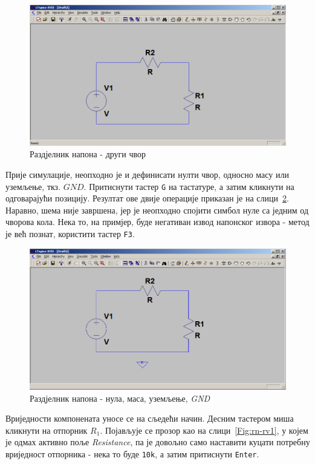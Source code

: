 \begin{figure}[h]
\centering
\includegraphics[width=\figwidth\textwidth]{figs/rn-n2.PNG}
\caption{Раздјелник напона - други чвор}
\label{Fig:rn-n2}
\end{figure}

Прије симулације, неопходно је и дефинисати нулти чвор, односно масу или уземљење, ткз. $GND$. Притиснути тастер \texttt{G} на тастатуре, а затим кликнути на одговарајући позицију. Резултат ове двије операције приказан је на слици~\ref{Fig:rn-g}. Наравно, шема није завршена, јер је неопходно спојити симбол нуле са једним од чворова кола. Нека то, на примјер, буде негативан извод напонског извора - метод је већ познат, користити тастер \texttt{F3}.

\begin{figure}[h]
\centering
\includegraphics[width=\figwidth\textwidth]{figs/rn-g.PNG}
\caption{Раздјелник напона - нула, маса, уземљење, \textit{GND}}
\label{Fig:rn-g}
\end{figure}

Вриједности компонената уносе се на сљедећи начин. Десним тастером миша кликнути на отпорник $R_1$. Појављује се прозор као на слици~\ref{Fig:rn-rv1}, у којем је одмах активно поље \textit{Resistance}, па је довољно само наставити куцати потребну вриједност отпорника - нека то буде \texttt{10k}, а затим притиснути \texttt{Enter}.

